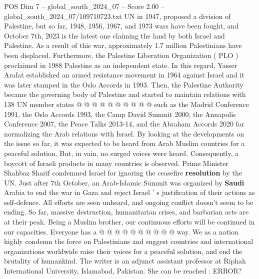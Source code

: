 \begin{textsample}{POS Dim 7 – global\_south\_2024\_07 – Score 2.00 – global\_south\_2024\_07/109710723.txt}
UN in 1947, proposed a division of Palestine, but so far, 1948, 1956, 1967, and 1973 wars have been fought, and October 7th, 2023 is the latest one claiming the land by both Israel and Palestine.
As a result of this war, approximately 1.7 million Palestinians have been displaced.
Furthermore, the Palestine Liberation Organization ( PLO ) proclaimed in 1988 Palestine as an independent state.
In this regard, Yasser Arafat established an armed resistance movement in 1964 against Israel and it was later stamped in the Oslo Accords in 1993.
Then, the Palestine Authority became the governing body of Palestine and started to maintain relations with 138 UN member states @ @ @ @ @ @ @ @ @ @ such as the Madrid Conference 1991, the Oslo Accords 1993, the Camp David Summit 2000, the Annapolis Conference 2007, the Peace Talks 2013-14, and the Abraham Accords 2020 for normalizing the Arab relations with Israel.
By looking at the developments on the issue so far, it was expected to be heard from Arab Muslim countries for a peaceful solution.
But, in vain, no surged voices were heard.
Consequently, a boycott of Israeli products in many countries is observed.
Prime Minister Shahbaz Sharif condemned Israel for ignoring the ceasefire \textbf{resolution} by the UN.
Just after 7th October, an Arab-Islamic Summit was organized by \textbf{Saudi} Arabia to end the war in Gaza and reject Israel ' s justification of their actions as self-defence.
All efforts are seen unheard, and ongoing conflict doesn't seem to be ending.
So far, massive destruction, humanitarian crises, and barbarian acts are at their peak.
Being a Muslim brother, our continuous efforts will be continued in our capacities.
Everyone has a @ @ @ @ @ @ @ @ @ @ way.
We as a nation highly condemn the force on Palestinians and suggest countries and international organizations worldwide raise their voices for a peaceful solution, and end the brutality of humankind.
The writer is an adjunct assistant professor at Riphah International University, Islamabad, Pakistan.
She can be reached : ERROR?

\end{textsample}
